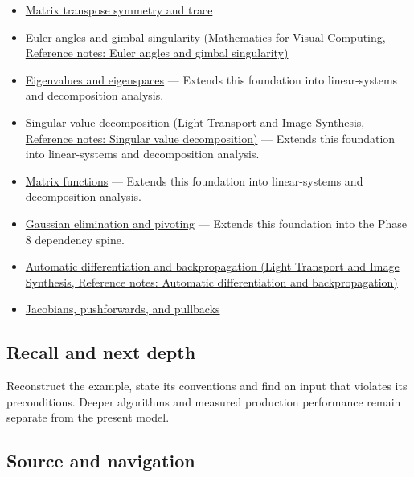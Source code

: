 \begin{itemize}
\item
  \hyperref[appendix-175ca5ff874d]{Matrix transpose symmetry and trace}
\item
  \href{../02-Mathematics-for-Visual-Computing/main.pdf\#nameddest=appendix-5f723fbd0593}{Euler angles and gimbal singularity (Mathematics for Visual Computing, Reference notes: Euler angles and gimbal singularity)}
\item
  \hyperref[appendix-0b3be18411f9]{Eigenvalues and eigenspaces} --- Extends this foundation into linear-systems and decomposition analysis.
\item
  \href{../04-Light-Transport-and-Image-Synthesis/main.pdf\#nameddest=appendix-1fad5e7f36fa}{Singular value decomposition (Light Transport and Image Synthesis, Reference notes: Singular value decomposition)} --- Extends this foundation into linear-systems and decomposition analysis.
\item
  \hyperref[appendix-0f4bc2bf2b1f]{Matrix functions} --- Extends this foundation into linear-systems and decomposition analysis.
\item
  \hyperref[appendix-f6e77f4a200f]{Gaussian elimination and pivoting} --- Extends this foundation into the Phase 8 dependency spine.
\item
  \href{../04-Light-Transport-and-Image-Synthesis/main.pdf\#nameddest=appendix-40df0855b4a7}{Automatic differentiation and backpropagation (Light Transport and Image Synthesis, Reference notes: Automatic differentiation and backpropagation)}
\item
  \hyperref[appendix-d8a7ddb675eb]{Jacobians, pushforwards, and pullbacks}
\end{itemize}

\subsection{Recall and next depth}\label{appendix-ab31ef447dbf-recall-and-next-depth}

Reconstruct the example, state its conventions and find an input that violates its preconditions. Deeper algorithms and measured production performance remain separate from the present model.

\subsection{Source and navigation}\label{appendix-ab31ef447dbf-source-and-navigation}


